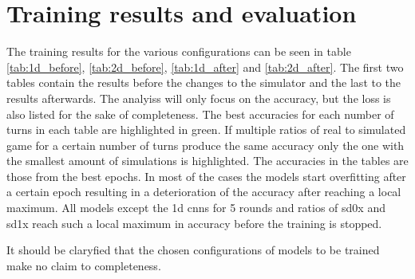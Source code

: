 \newpage
   
\section{Training results and evaluation}
\label{training_results_and_evaluation}


The training results for the various configurations can be seen in table \ref{tab:1d_before}, \ref{tab:2d_before}, \ref{tab:1d_after} and \ref{tab:2d_after}. The first two tables contain the results before the changes to the simulator and the last to the results afterwards. The analyiss will only focus on the accuracy, but the loss is also listed for the sake of completeness. The best accuracies for each number of turns in each table are highlighted in green. If multiple ratios of real to simulated game for a certain number of turns produce the same accuracy only the one with the smallest amount of simulations is highlighted. The accuracies in the tables are those from the best epochs. In most of the cases the models start overfitting after a certain epoch resulting in a deterioration of the accuracy after reaching a local maximum. All models except the 1d cnns for 5 rounds and ratios of sd0x and sd1x reach such a local maximum in accuracy before the training is stopped. 

It should be claryfied that the chosen configurations of models to be trained make no claim to completeness. 




\newpage

